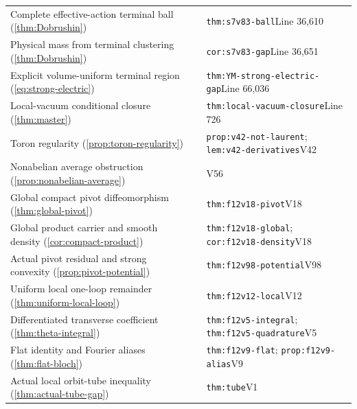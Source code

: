 \documentclass[11pt,oneside,openany]{book}
\theoremstyle{definition}
\theoremstyle{remark}
\begin{document}
\begin{longtable}{L{0.32\textwidth}L{0.12\textwidth}L{0.477\textwidth}}
Complete effective-action terminal ball (\cref{thm:Dobrushin}) & \cite{F7} & \nolinkurl{thm:s7v83-ball}\newline Line 36,610 \\
Physical mass from terminal clustering (\cref{thm:Dobrushin}) & \cite{F7} & \nolinkurl{cor:s7v83-gap}\newline Line 36,651 \\
Explicit volume-uniform terminal region (\cref{eq:strong-electric}) & \cite{GT} & \nolinkurl{thm:YM-strong-electric-gap}\newline Line 66,036 \\
Local-vacuum conditional closure (\cref{thm:master}) & \cite{F1} & \nolinkurl{thm:local-vacuum-closure}\newline Line 726 \\
Toron regularity (\cref{prop:toron-regularity}) & \cite{F11} & \nolinkurl{prop:v42-not-laurent}; \nolinkurl{lem:v42-derivatives}\newline V42 \\
Nonabelian average obstruction (\cref{prop:nonabelian-average}) & \cite{F11} & V56 \\
Global compact pivot diffeomorphism (\cref{thm:global-pivot}) & \cite{F12} & \nolinkurl{thm:f12v18-pivot}\newline V18 \\
Global product carrier and smooth density (\cref{cor:compact-product}) & \cite{F12} & \nolinkurl{thm:f12v18-global}; \nolinkurl{cor:f12v18-density}\newline V18 \\
Actual pivot residual and strong convexity (\cref{prop:pivot-potential}) & \cite{F12} & \nolinkurl{thm:f12v98-potential}\newline V98 \\
Uniform local one-loop remainder (\cref{thm:uniform-local-loop}) & \cite{F12} & \nolinkurl{thm:f12v12-local}\newline V12 \\
Differentiated transverse coefficient (\cref{thm:theta-integral}) & \cite{F12} & \nolinkurl{thm:f12v5-integral}; \nolinkurl{thm:f12v5-quadrature}\newline V5 \\
Flat identity and Fourier aliases (\cref{thm:flat-bloch}) & \cite{F12} & \nolinkurl{thm:f12v9-flat}; \nolinkurl{prop:f12v9-alias}\newline V9 \\
Actual local orbit-tube inequality (\cref{thm:actual-tube-gap}) & \cite{F13} & \nolinkurl{thm:tube}\newline V1 \\

\end{longtable}
\end{document}
